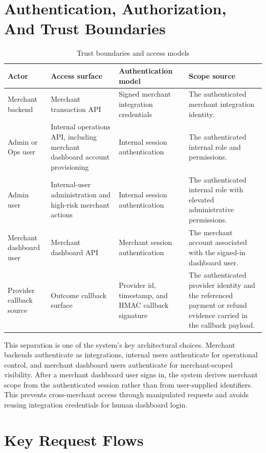 \newpage
\section{Authentication, Authorization, And Trust Boundaries}

\begin{table}[!htbp]
\centering
\caption{Trust boundaries and access models}
\begin{tabularx}{\textwidth}{L{0.20\textwidth}L{0.21\textwidth}L{0.24\textwidth}Y}
\toprule
\textbf{Actor} & \textbf{Access surface} & \textbf{Authentication model} & \textbf{Scope source} \\
\midrule
Merchant backend & Merchant transaction API & Signed merchant integration credentials & The authenticated merchant integration identity. \\
\bodyrowrule
Admin or Ops user & Internal operations API, including merchant dashboard account provisioning & Internal session authentication & The authenticated internal role and permissions. \\
\bodyrowrule
Admin user & Internal-user administration and high-risk merchant actions & Internal session authentication & The authenticated internal role with elevated administrative permissions. \\
\bodyrowrule
Merchant dashboard user & Merchant dashboard API & Merchant session authentication & The merchant account associated with the signed-in dashboard user. \\
\bodyrowrule
Provider callback source & Outcome callback surface & Provider id, timestamp, and HMAC callback signature & The authenticated provider identity and the referenced payment or refund evidence carried in the callback payload. \\
\bottomrule
\end{tabularx}
\end{table}

This separation is one of the system's key architectural choices. Merchant
backends authenticate as integrations, internal users authenticate for
operational control, and merchant dashboard users authenticate for
merchant-scoped visibility. After a merchant dashboard user signs in, the
system derives merchant scope from the authenticated session rather than from
user-supplied identifiers. This prevents cross-merchant access through
manipulated requests and avoids reusing integration credentials for human
dashboard login.

\newpage
\section{Key Request Flows}

